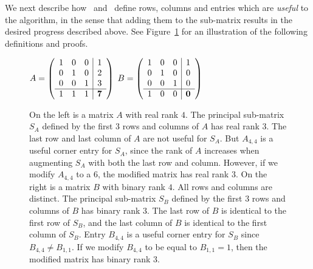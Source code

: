 \documentclass[11pt]{article}
\begin{document}
{{We next describe how~\cite{krauthgamer2003property} and~\cite{parnas2021property} define
rows, columns and entries which are {\em useful} to the algorithm, in the sense that adding them to the sub-matrix results in the desired progress described above.
See Figure~\ref{fig:propertytesting} for an illustration of the following definitions and proofs.

\begin{figure}[htb!]
\begin{center}
$
A = \left(
  \begin{array}{ccc|c}
    1 & 0 & 0 & 1 \\
    0 & 1 & 0 & 2 \\
    0 & 0 & 1 & 3 \\\hline
    1 & 1 & 1 & {\bf 7} \\
  \end{array}
\right)
$
\;\;\;\;\;\;\;\;\;\;\;\;
$
B = \left(
  \begin{array}{ccc|c}
    1 & 0 & 0 & 1 \\
    0 & 1 & 0 & 0 \\
    0 & 0 & 1 & 0 \\\hline
    1 & 0 & 0 & {\bf 0} \\
  \end{array}
\right)
$
\end{center}
\caption{On the left is a matrix $A$ with real rank $4$. The principal sub-matrix $S_A$ defined by the first $3$ rows and columns of $A$ has real rank $3$.
The last row and last column of $A$ are not useful for $S_A$.
But $A_{4,4}$ is a useful corner entry for $S_A$, since the rank of $A$ increases when augmenting $S_A$ with both the last row and column.
However, if we modify $A_{4,4}$ to a $6$, the modified matrix has real rank $3$.
\newline
On the right is a matrix $B$ with binary rank $4$. All rows and columns are distinct. The principal sub-matrix $S_B$ defined by the first $3$ rows and columns of $B$ has binary rank $3$.
The last row of $B$ is identical to the first row of $S_B$, and the last column of $B$ is identical to the first column of $S_B$.
Entry $B_{4,4}$ is a useful corner entry for $S_B$ since $B_{4,4} \neq B_{1,1}$.
If we modify $B_{4,4}$ to be equal to $B_{1,1} = 1$, then the modified matrix has binary rank $3$.}
\label{fig:propertytesting}	
\end{figure}


}}
\end{document}
